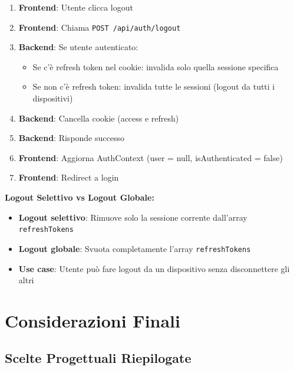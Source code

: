 \documentclass[11pt,a4paper]{article}
\newcommand{\code}[1]{\texttt{#1}}
\begin{document}
\begin{enumerate}
    \item \textbf{Frontend}: Utente clicca logout
    \item \textbf{Frontend}: Chiama \code{POST /api/auth/logout}
    \item \textbf{Backend}: Se utente autenticato:
        \begin{itemize}
            \item Se c'è refresh token nel cookie: invalida solo quella sessione specifica
            \item Se non c'è refresh token: invalida tutte le sessioni (logout da tutti i dispositivi)
        \end{itemize}
    \item \textbf{Backend}: Cancella cookie (access e refresh)
    \item \textbf{Backend}: Risponde successo
    \item \textbf{Frontend}: Aggiorna AuthContext (user = null, isAuthenticated = false)
    \item \textbf{Frontend}: Redirect a login
\end{enumerate}

\textbf{Logout Selettivo vs Logout Globale:}
\begin{itemize}
    \item \textbf{Logout selettivo}: Rimuove solo la sessione corrente dall'array \code{refreshTokens}
    \item \textbf{Logout globale}: Svuota completamente l'array \code{refreshTokens}
    \item \textbf{Use case}: Utente può fare logout da un dispositivo senza disconnettere gli altri
\end{itemize}

\section{Considerazioni Finali}

\subsection{Scelte Progettuali Riepilogate}
\end{document}
